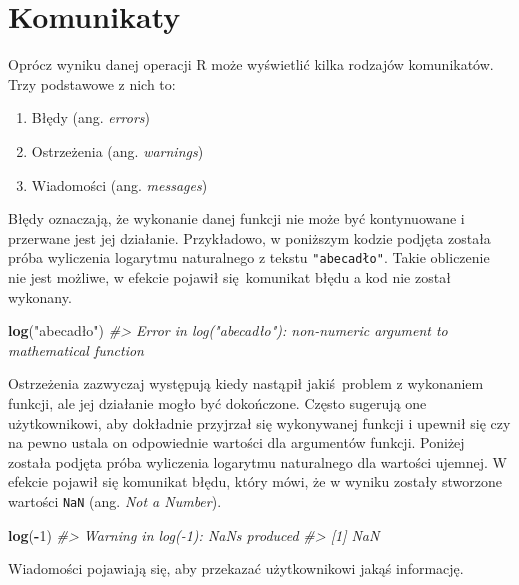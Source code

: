 \documentclass[paper=6in:9in,pagesize=pdftex,headinclude=on,footinclude=on,10pt]{scrbook}
\newenvironment{Shaded}{\begin{snugshade}}{\end{snugshade}}
\newcommand{\CommentTok}[1]{\textcolor[rgb]{0.56,0.35,0.01}{\textit{#1}}}
\newcommand{\DecValTok}[1]{\textcolor[rgb]{0.00,0.00,0.81}{#1}}
\newcommand{\KeywordTok}[1]{\textcolor[rgb]{0.13,0.29,0.53}{\textbf{#1}}}
\newcommand{\NormalTok}[1]{#1}
\newcommand{\OperatorTok}[1]{\textcolor[rgb]{0.81,0.36,0.00}{\textbf{#1}}}
\newcommand{\StringTok}[1]{\textcolor[rgb]{0.31,0.60,0.02}{#1}}
\providecommand{\tightlist}{%
  \setlength{\itemsep}{0pt}\setlength{\parskip}{0pt}}
\begin{document}
\hypertarget{komunikaty}{%
\section{Komunikaty}\label{komunikaty}}

Oprócz wyniku danej operacji R może wyświetlić kilka rodzajów komunikatów.
Trzy podstawowe z nich to:

\begin{enumerate}
\def\labelenumi{\arabic{enumi}.}
\tightlist
\item
  Błędy (ang. \emph{errors})
\item
  Ostrzeżenia (ang. \emph{warnings})
\item
  Wiadomości (ang. \emph{messages})
\end{enumerate}

Błędy oznaczają, że wykonanie danej funkcji nie może być kontynuowane i przerwane jest jej działanie.
Przykładowo, w poniższym kodzie podjęta została próba wyliczenia logarytmu naturalnego z tekstu \texttt{"abecadło"}.
Takie obliczenie nie jest możliwe, w efekcie pojawił się~komunikat błędu a kod nie został wykonany.

\begin{Shaded}
\begin{Highlighting}[]
\KeywordTok{log}\NormalTok{(}\StringTok{"abecadło"}\NormalTok{)}
\CommentTok{#> Error in log("abecadło"): non-numeric argument to mathematical function}
\end{Highlighting}
\end{Shaded}

Ostrzeżenia zazwyczaj występują kiedy nastąpił jakiś~problem z wykonaniem funkcji, ale jej działanie mogło być dokończone.
Często sugerują one użytkownikowi, aby dokładnie przyjrzał się wykonywanej funkcji i upewnił się czy na pewno ustala on odpowiednie wartości dla argumentów funkcji.
Poniżej została podjęta próba wyliczenia logarytmu naturalnego dla wartości ujemnej.
W efekcie pojawił się komunikat błędu, który mówi, że w wyniku zostały stworzone wartości \texttt{NaN} (ang. \emph{Not a Number}).

\begin{Shaded}
\begin{Highlighting}[]
\KeywordTok{log}\NormalTok{(}\OperatorTok{-}\DecValTok{1}\NormalTok{)}
\CommentTok{#> Warning in log(-1): NaNs produced}
\CommentTok{#> [1] NaN}
\end{Highlighting}
\end{Shaded}

Wiadomości pojawiają się, aby przekazać użytkownikowi jakąś informację.
\end{document}
